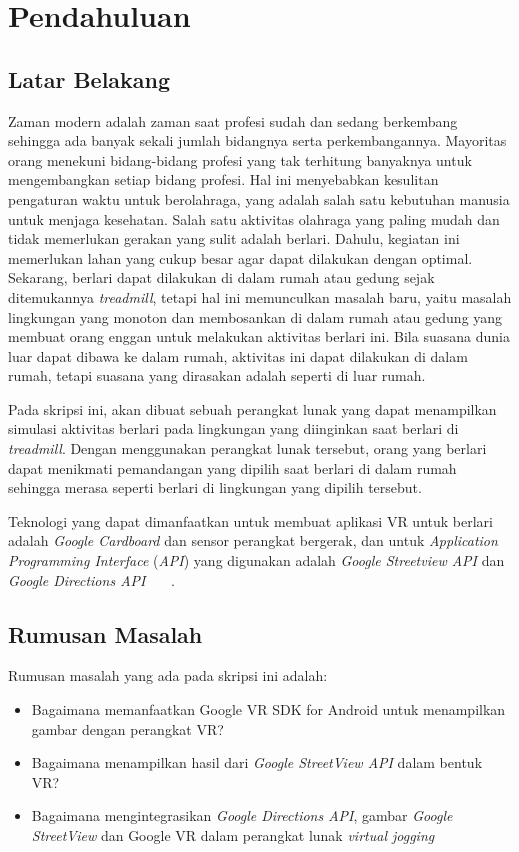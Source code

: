 \chapter{Pendahuluan}
\label{chap:intro}
   
\section{Latar Belakang}
\label{sec:label}

Zaman modern adalah zaman saat profesi sudah dan sedang berkembang sehingga ada banyak sekali jumlah bidangnya serta perkembangannya. Mayoritas orang menekuni bidang-bidang profesi yang tak terhitung banyaknya untuk mengembangkan setiap bidang profesi. Hal ini menyebabkan kesulitan pengaturan waktu untuk berolahraga, yang adalah salah satu kebutuhan manusia untuk menjaga kesehatan. Salah satu aktivitas olahraga yang paling mudah dan tidak memerlukan gerakan yang sulit adalah berlari. Dahulu, kegiatan ini memerlukan lahan yang cukup besar agar dapat dilakukan dengan optimal. Sekarang, berlari dapat dilakukan di dalam rumah atau gedung sejak ditemukannya {\it treadmill}, tetapi hal ini memunculkan masalah baru, yaitu masalah lingkungan yang monoton dan membosankan di dalam rumah atau gedung yang membuat orang enggan untuk melakukan aktivitas berlari ini. Bila suasana dunia luar dapat dibawa ke dalam rumah, aktivitas ini dapat dilakukan di dalam rumah, tetapi suasana yang dirasakan adalah seperti di luar rumah. 

Pada skripsi ini, akan dibuat sebuah perangkat lunak yang dapat menampilkan simulasi aktivitas berlari pada lingkungan yang diinginkan saat berlari di {\it treadmill}. Dengan menggunakan perangkat lunak tersebut, orang yang berlari dapat menikmati pemandangan yang dipilih saat berlari di dalam rumah sehingga merasa seperti berlari di lingkungan yang dipilih tersebut.

Teknologi yang dapat dimanfaatkan untuk membuat aplikasi VR untuk berlari adalah \textit{Google Cardboard} dan sensor perangkat bergerak, dan untuk {\it Application Programming Interface} (\textit{API}) yang digunakan adalah {\it Google Streetview API}  dan \textit{Google Directions API} ~\cite{quickstart-google-vr}~\cite{streetview-api}~\cite{directions-api}. 

\section{Rumusan Masalah}
\label{sec:rumusan}
Rumusan masalah yang ada pada skripsi ini adalah:
\begin{itemize}
	\item Bagaimana memanfaatkan Google VR SDK for Android untuk menampilkan gambar dengan perangkat VR?
	\item Bagaimana menampilkan hasil dari \textit{Google StreetView API} dalam bentuk VR?
	\item Bagaimana mengintegrasikan \textit{Google Directions API}, gambar \textit{Google StreetView}  dan Google VR dalam perangkat lunak \textit{virtual jogging}
\end{itemize}

